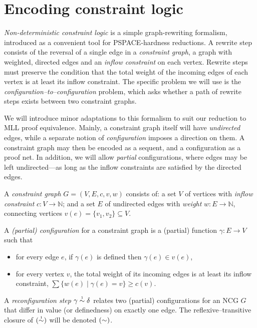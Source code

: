 \documentclass[conference]{IEEEtran}
\let\beforesection=\medskip
\let\aftersection=\noindent
\let\capsabbrev=\uppercase
\begin{document}

\beforesection

\section{Encoding constraint logic}
\label{sec:encoding}

\aftersection
%
\emph{Non-deterministic constraint logic} \cite{Hearn-Demaine-2005,Demaine-Hearn-2008} is a simple graph-rewriting formalism, introduced as a convenient tool for \capsabbrev{pspace}-hardness reductions.
%
A rewrite step consists of the reversal of a single edge in a \emph{constraint graph}, a graph with weighted, directed edges and an \emph{inflow constraint} on each vertex.
%
Rewrite steps must preserve the condition that the total weight of the incoming edges of each vertex is at least its inflow constraint.
%
The specific problem we will use is the \emph{configuration--to--configuration} problem, which asks whether a path of rewrite steps exists between two constraint graphs.


We will introduce minor adaptations to this formalism to suit our reduction to \capsabbrev{mll} proof equivalence.
%
Mainly, a constraint graph itself will have \emph{undirected} edges, while a separate notion of \emph{configuration} imposes a direction on them.
%
A constraint graph may then be encoded as a sequent, and a configuration as a proof net.
%
In addition, we will allow \emph{partial} configurations, where edges may be left undirected---as long as the inflow constraints are satisfied by the directed edges.


\begin{definition} 
A \emph{constraint graph} $G=(V,E,c,v,w)$ consists of: a set $V$ of vertices with \emph{inflow constraint} $c\colon V\to\mathbb N$; and a set $E$ of undirected edges with \emph{weight} $w\colon E\to\mathbb N$, connecting vertices $v(e)=\{v_1,v_2\}\subseteq V$.

\smallskip

A \emph{(partial) configuration} for a constraint graph is a (partial) function $\gamma\colon E\to V$ such that
\begin{itemize}
	\item
for every edge $e$, if $\gamma(e)$ is defined then $\gamma(e)\in v(e)$,
	\item
for every vertex $v$, the total weight of its incoming edges is at least its inflow constraint, 
$\sum\{w(e)\mid\gamma(e)=v\}\geq c(v)$.
\end{itemize} 

\smallskip
A \emph{reconfiguration step} $\gamma\perm*\delta$ relates two (partial) configurations for an \capsabbrev{ncg} $G$ that differ in value (or definedness) on exactly one edge.
%
The reflexive--transitive closure of $(\perm*)$ will be denoted $(\perm)$.
%
\end{definition}
\end{document}

